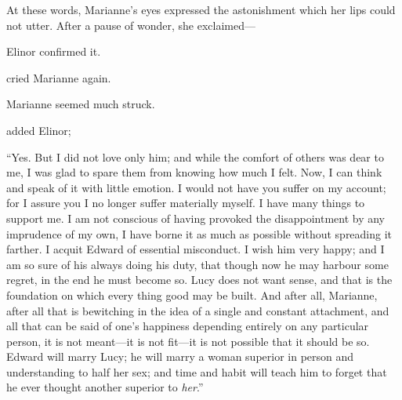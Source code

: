 At these words, Marianne's eyes expressed the astonishment which her lips could not utter. After a pause of wonder, she exclaimed---


Elinor confirmed it.



 cried Marianne again. 


Marianne seemed much struck.

 added Elinor; 


“Yes. But I did not love only him; and while the comfort of others was dear to me, I was glad to spare them from knowing how much I felt. Now, I can think and speak of it with little emotion. I would not have you suffer on my account; for I assure you I no longer suffer materially myself. I have many things to support me. I am not conscious of having provoked the disappointment by any imprudence of my own, I have borne it as much as possible without spreading it farther. I acquit Edward of essential misconduct. I wish him very happy; and I am so sure of his always doing his duty, that though now he may harbour some regret, in the end he must become so. Lucy does not want sense, and that is the foundation on which every thing good may be built. And after all, Marianne, after all that is bewitching in the idea of a single and constant attachment, and all that can be said of one's happiness depending entirely on any particular person, it is not meant---it is not fit---it is not possible that it should be so. Edward will marry Lucy; he will marry a woman superior in person and understanding to half her sex; and time and habit will teach him to forget that he ever thought another superior to {\em her}.”

